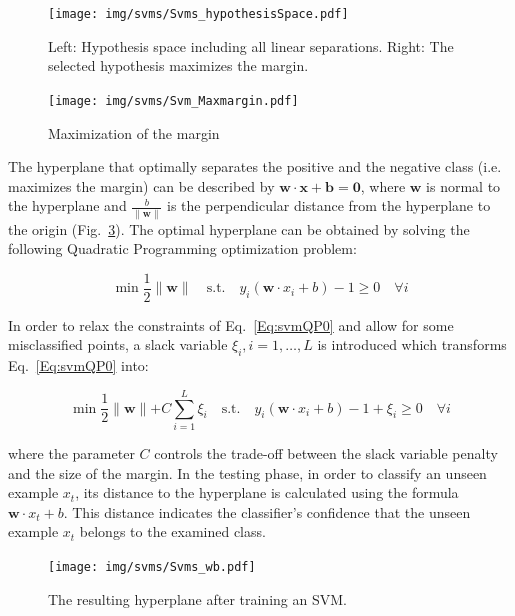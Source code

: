 \begin{figure}[h]
\centering
  \texttt{[image: img/svms/Svms\_hypothesisSpace.pdf]}
  \caption[Hypothesis spaces for SVM classifier.]{Left: Hypothesis space including all linear separations. Right: The selected hypothesis maximizes the margin.}
  \label{fig:svm_hypothesisSpace}
\end{figure}


\begin{figure}[h]
\centering
  \texttt{[image: img/svms/Svm\_Maxmargin.pdf]}
  \caption{Maximization of the margin}
  \label{fig:svm_margin}
\end{figure}

\noindent The hyperplane that optimally separates the positive and the
negative class (i.e. maximizes the margin) can be described by
$\mathbf{w\cdot x + b = 0}$, where $\mathbf{w}$ is normal to the
hyperplane and $\frac{b}{\parallel\mathbf{w}\parallel}$ is the
perpendicular distance from the hyperplane to the origin
(Fig.~\ref{fig:svm_wb}). The optimal hyperplane can be obtained by
solving the following Quadratic Programming optimization problem:

\begin{equation}\label{Eq:svmQP0}
  \min \frac{1}{2}\parallel\mathbf{w}\parallel \quad \text{s.t.} \quad y_i(\mathbf{w}\cdot x_i + b) -1 \ge 0 \quad \forall i
\end{equation}

In order to relax the constraints of Eq.~\ref{Eq:svmQP0} and allow for
some misclassified points, a slack variable $\xi_i, i=1,\ldots,L$ is
introduced which transforms Eq.~\ref{Eq:svmQP0} into:

\begin{equation}\label{Eq:svmQPxi}
  \min \frac{1}{2}\parallel\mathbf{w}\parallel + C\sum_{i=1}^{L}\xi_i \quad \text{s.t.} \quad y_i(\mathbf{w}\cdot x_i + b) -1 +\xi_i \ge 0 \quad \forall i
\end{equation}

\noindent where the parameter $C$ controls the trade-off between the
slack variable penalty and the size of the margin. In the testing
phase, in order to classify an unseen example $x_t$, its distance to
the hyperplane is calculated using the formula $\mathbf{w}\cdot x_t +
b$. This distance indicates the classifier's confidence that the
unseen example $x_t$ belongs to the examined class.

\begin{figure}[h]
\centering
  \texttt{[image: img/svms/Svms\_wb.pdf]}
  \caption{The resulting hyperplane after training an SVM.}
  \label{fig:svm_wb}
\end{figure}

